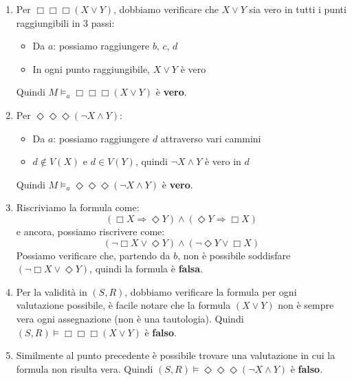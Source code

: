 \documentclass[a4paper,12pt]{article}
\begin{document}
{\begin{enumerate}
              Quindi $M \models_a \Diamond(X \land Y) \Rightarrow \Box(X \lor Y)$ è \textbf{vero}.

        \item Per $\Box\Box\Box(X \lor Y)$, dobbiamo verificare che $X \lor Y$ sia vero in tutti i punti raggiungibili in 3 passi:
              \begin{itemize}
                  \item Da $a$: possiamo raggiungere $b$, $c$, $d$
                  \item In ogni punto raggiungibile, $X \lor Y$ è vero
              \end{itemize}
              Quindi $M \models_a \Box\Box\Box(X \lor Y)$ è \textbf{vero}.

        \item Per $\Diamond\Diamond\Diamond(\neg X \land Y)$:
              \begin{itemize}
                  \item Da $a$: possiamo raggiungere $d$ attraverso vari cammini
                  \item $d \notin V(X)$ e $d \in V(Y)$, quindi $\neg X \land Y$ è vero in $d$
              \end{itemize}
              Quindi $M \models_a \Diamond\Diamond\Diamond(\neg X \land Y)$ è \textbf{vero}.

        \item Riscriviamo la formula come:
              \[
                  (\Box X \Rightarrow \Diamond Y) \land (\Diamond Y \Rightarrow \Box X)
              \]
              e ancora, possiamo riscrivere come:
              \[
                  (\neg\Box X \lor \Diamond Y) \land (\neg\Diamond Y \lor \Box X)
              \]
              Possiamo verificare che, partendo da $b$, non è possibile soddisfare $ (\neg\Box X \lor \Diamond Y)$, quindi la formula è \textbf{falsa}.

        \item Per la validità in $(S,R)$, dobbiamo verificare la formula per ogni valutazione possibile, è facile notare che la formula $(X \lor Y)$ non è sempre vera ogni assegnazione (non è una tautologia). Quindi $(S,R) \models \Box\Box\Box(X \lor Y)$ è \textbf{falso}.

        \item Similmente al punto precedente è possibile trovare una valutazione in cui la formula non risulta vera. Quindi $(S,R) \models \Diamond\Diamond\Diamond(\neg X \land Y)$ è \textbf{falso}.
    \end{enumerate}
}
\end{document}
